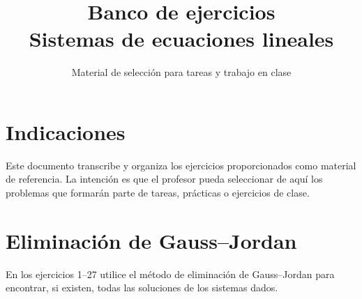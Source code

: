 \documentclass[12pt]{article}
\title{\textbf{Banco de ejercicios}\\
\large Sistemas de ecuaciones lineales}
\author{Material de selección para tareas y trabajo en clase}
\date{}
\begin{document}
\maketitle

\section*{Indicaciones}
Este documento transcribe y organiza los ejercicios proporcionados como material de referencia.
La intención es que el profesor pueda seleccionar de aquí los problemas que formarán parte de
tareas, prácticas o ejercicios de clase.

\section{Eliminación de Gauss--Jordan}

En los ejercicios 1--27 utilice el método de eliminación de Gauss--Jordan para encontrar,
si existen, todas las soluciones de los sistemas dados.
\end{document}
